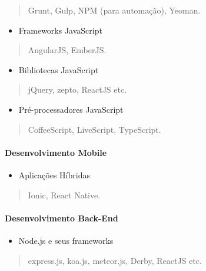 \documentclass[]{article}
\providecommand{\tightlist}{%
  \setlength{\itemsep}{0pt}\setlength{\parskip}{0pt}}
\let\oldparagraph\paragraph
\renewcommand{\paragraph}[1]{\oldparagraph{#1}\mbox{}}
\begin{document}
\begin{quote}
Grunt, Gulp, NPM (para automação), Yeoman.
\end{quote}

\begin{itemize}
\tightlist
\item
  Frameworks JavaScript
\end{itemize}

\begin{quote}
AngularJS, EmberJS.
\end{quote}

\begin{itemize}
\tightlist
\item
  Bibliotecas JavaScript
\end{itemize}

\begin{quote}
jQuery, zepto, ReactJS etc.
\end{quote}

\begin{itemize}
\tightlist
\item
  Pré-processadores JavaScript
\end{itemize}

\begin{quote}
CoffeeScript, LiveScript, TypeScript.
\end{quote}

\paragraph{Desenvolvimento Mobile}\label{desenvolvimento-mobile}

\begin{itemize}
\tightlist
\item
  Aplicações Híbridas
\end{itemize}

\begin{quote}
Ionic, React Native.
\end{quote}

\paragraph{Desenvolvimento Back-End}\label{desenvolvimento-back-end}

\begin{itemize}
\tightlist
\item
  Node.js e seus frameworks
\end{itemize}

\begin{quote}
express.js, koa.js, meteor.js, Derby, ReactJS etc.
\end{quote}
\end{document}
